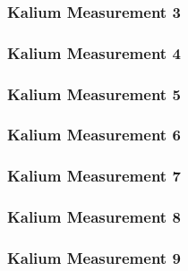 \documentclass[12pt]{article}
\begin{document}
\subsubsection{Kalium Measurement 3}

\subsubsection{Kalium Measurement 4}

\subsubsection{Kalium Measurement 5}

\subsubsection{Kalium Measurement 6}

\subsubsection{Kalium Measurement 7}

\subsubsection{Kalium Measurement 8}

\subsubsection{Kalium Measurement 9}

%


\end{document}
